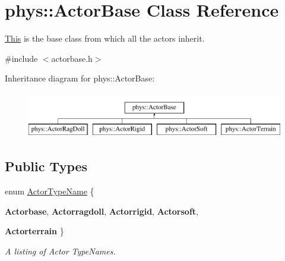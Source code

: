 \hypertarget{classphys_1_1ActorBase}{
\section{phys::ActorBase Class Reference}
\label{d8/d0f/classphys_1_1ActorBase}
}


\hyperlink{structThis}{This} is the base class from which all the actors inherit.  




{\ttfamily \#include $<$actorbase.h$>$}

Inheritance diagram for phys::ActorBase:\begin{figure}[H]
\begin{center}
\leavevmode
\includegraphics[height=2cm]{d8/d0f/classphys_1_1ActorBase}
\end{center}
\end{figure}
\subsection*{Public Types}
\begin{DoxyCompactItemize}
\item 
enum \hyperlink{classphys_1_1ActorBase_aff3a7c464e8ce82576073f8f891434b7}{ActorTypeName} \{ \par
{\bfseries Actorbase}, 
{\bfseries Actorragdoll}, 
{\bfseries Actorrigid}, 
{\bfseries Actorsoft}, 
\par
{\bfseries Actorterrain}
 \}
\begin{DoxyCompactList}\small\item\em A listing of Actor TypeNames. \item\end{DoxyCompactList}\end{DoxyCompactItemize}
